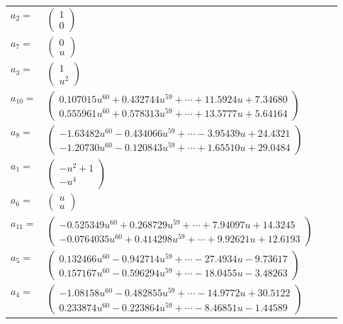 \documentclass[1p]{elsarticle_modified}
\theoremstyle{definition}
\begin{document}
\begin{tabular}{m{7pt} m{180pt} m{7pt} m{180pt} }
\flushright $a_{2}=$&$\begin{pmatrix}1\\0\end{pmatrix}$ \\
\flushright $a_{7}=$&$\begin{pmatrix}0\\u\end{pmatrix}$ \\
\flushright $a_{3}=$&$\begin{pmatrix}1\\u^2\end{pmatrix}$ \\
\flushright $a_{10}=$&$\begin{pmatrix}0.107015 u^{60}+0.432744 u^{59}+\cdots+11.5924 u+7.34680\\0.555961 u^{60}+0.578313 u^{59}+\cdots+13.5777 u+5.64164\end{pmatrix}$ \\
\flushright $a_{8}=$&$\begin{pmatrix}-1.63482 u^{60}-0.434066 u^{59}+\cdots-3.95439 u+24.4321\\-1.20730 u^{60}-0.120843 u^{59}+\cdots+1.65510 u+29.0484\end{pmatrix}$ \\
\flushright $a_{1}=$&$\begin{pmatrix}- u^2+1\\- u^4\end{pmatrix}$ \\
\flushright $a_{6}=$&$\begin{pmatrix}u\\u\end{pmatrix}$ \\
\flushright $a_{11}=$&$\begin{pmatrix}-0.525349 u^{60}+0.268729 u^{59}+\cdots+7.94097 u+14.3245\\-0.0764035 u^{60}+0.414298 u^{59}+\cdots+9.92621 u+12.6193\end{pmatrix}$ \\
\flushright $a_{5}=$&$\begin{pmatrix}0.132466 u^{60}-0.942714 u^{59}+\cdots-27.4934 u-9.73617\\0.157167 u^{60}-0.596294 u^{59}+\cdots-18.0455 u-3.48263\end{pmatrix}$ \\
\flushright $a_{4}=$&$\begin{pmatrix}-1.08158 u^{60}-0.482855 u^{59}+\cdots-14.9772 u+30.5122\\0.233874 u^{60}-0.223864 u^{59}+\cdots-8.46851 u-1.44589\end{pmatrix}$ \\

\end{tabular}
\end{document}
